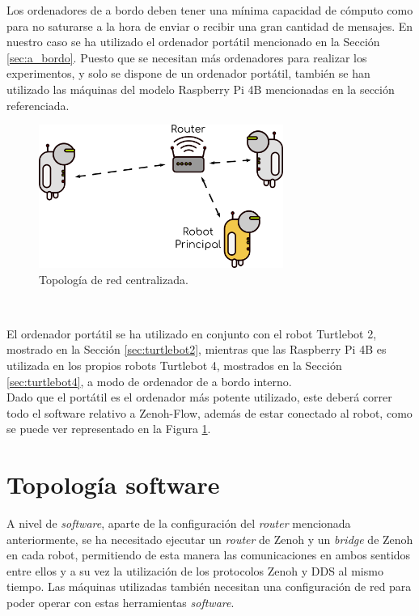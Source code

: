 Los ordenadores de a bordo deben tener una mínima capacidad de cómputo como para
no saturarse a la hora de enviar o recibir una gran cantidad de mensajes.
En nuestro caso se ha utilizado el ordenador portátil mencionado en la Sección
\ref{sec:a_bordo}.
Puesto que se necesitan más ordenadores para realizar los experimentos, y solo
se dispone de un ordenador portátil, también se han utilizado las máquinas del
modelo Raspberry Pi 4B mencionadas en la sección referenciada.
\\

\begin{figure} [h!]
  \begin{center}
    \includegraphics[width=8cm]{figs/network_topology}
  \end{center}
  \caption{Topología de red centralizada.}
  \label{fig:network_topology}
\end{figure}\

El ordenador portátil se ha utilizado en conjunto con el robot Turtlebot 2,
mostrado en la Sección \ref{sec:turtlebot2}, mientras que las Raspberry Pi 4B es
utilizada en los propios robots Turtlebot 4, mostrados en la Sección
\ref{sec:turtlebot4}, a modo de ordenador de a bordo interno.
\\

Dado que el portátil es el ordenador más potente utilizado, este deberá correr
todo el software relativo a Zenoh-Flow, además de estar conectado al robot, como
se puede ver representado en la Figura \ref{fig:network_topology}.
\\



\section{Topología software}
\label{sec:topologia_sw}

A nivel de \textit{software}, aparte de la configuración del \textit{router}
mencionada anteriormente, se ha necesitado ejecutar un \textit{router} de Zenoh
y un \textit{bridge} de Zenoh en cada robot, permitiendo de esta manera las
comunicaciones en ambos sentidos entre ellos y a su vez la utilización de los
protocolos Zenoh y DDS al mismo tiempo.
Las máquinas utilizadas también necesitan una configuración de red para poder
operar con estas herramientas \textit{software}.
\\

